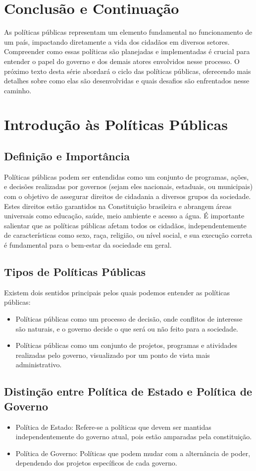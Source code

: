 \documentclass[
   article,       
   12pt,          
   oneside,       
   a4paper,       
   english,       
   brazil,        
   sumario=tradicional
   ]{abntex2}
\begin{document}
\section{Conclusão e Continuação}
As políticas públicas representam um elemento fundamental no funcionamento de um país, impactando diretamente a vida dos cidadãos em diversos setores. Compreender como essas políticas são planejadas e implementadas é crucial para entender o papel do governo e dos demais atores envolvidos nesse processo. O próximo texto desta série abordará o ciclo das políticas públicas, oferecendo mais detalhes sobre como elas são desenvolvidas e quais desafios são enfrentados nesse caminho.
\section{Introdução às Políticas Públicas}
\subsection{Definição e Importância}
Políticas públicas podem ser entendidas como um conjunto de programas, ações, e decisões realizadas por governos (sejam eles nacionais, estaduais, ou municipais) com o objetivo de assegurar direitos de cidadania a diversos grupos da sociedade. Estes direitos estão garantidos na Constituição brasileira e abrangem áreas universais como educação, saúde, meio ambiente e acesso a água. É importante salientar que as políticas públicas afetam todos os cidadãos, independentemente de características como sexo, raça, religião, ou nível social, e sua execução correta é fundamental para o bem-estar da sociedade em geral.

\subsection{Tipos de Políticas Públicas}
Existem dois sentidos principais pelos quais podemos entender as políticas públicas:
\begin{itemize}
    \item Políticas públicas como um processo de decisão, onde conflitos de interesse são naturais, e o governo decide o que será ou não feito para a sociedade.
    \item Políticas públicas como um conjunto de projetos, programas e atividades realizadas pelo governo, visualizado por um ponto de vista mais administrativo.
\end{itemize}

\subsection{Distinção entre Política de Estado e Política de Governo}
\begin{itemize}
    \item Política de Estado: Refere-se a políticas que devem ser mantidas independentemente do governo atual, pois estão amparadas pela constituição.
    \item Política de Governo: Políticas que podem mudar com a alternância de poder, dependendo dos projetos específicos de cada governo.
\end{itemize}
\end{document}
